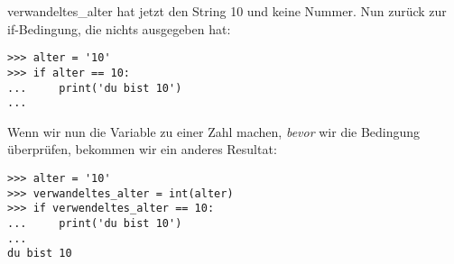 \noindent
verwandeltes\_alter hat jetzt den String 10 und keine Nummer. Nun zurück zur if-Bedingung, die nichts ausgegeben hat:

\begin{Verbatim}[frame=single]
>>> alter = '10'
>>> if alter == 10:
...     print('du bist 10')
...
\end{Verbatim}

\noindent
Wenn wir nun die Variable zu einer Zahl machen, \emph{bevor} wir die Bedingung überprüfen, bekommen wir ein anderes Resultat:

\begin{Verbatim}[frame=single]
>>> alter = '10'
>>> verwandeltes_alter = int(alter)
>>> if verwendeltes_alter == 10:
...     print('du bist 10')
...
du bist 10
\end{Verbatim}

\newpage
